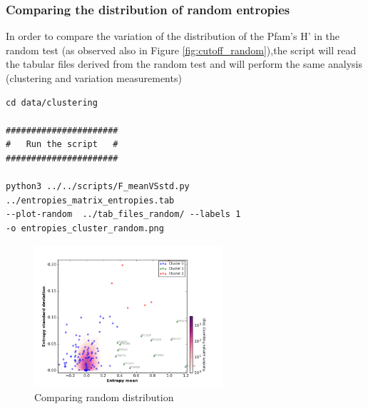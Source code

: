 \documentclass[12pt]{report}
\begin{document}
\subsubsection{Comparing  the distribution of random entropies}
In order to compare the variation of the distribution of the Pfam's H' in the random test (as observed also in Figure \ref{fig:cutoff_random}),the script will read the tabular files derived from the random test and will perform the same analysis (clustering and variation measurements) 
\begin{verbatim}
cd data/clustering

######################
#   Run the script   #
######################

python3 ../../scripts/F_meanVSstd.py  ../entropies_matrix_entropies.tab 
--plot-random  ../tab_files_random/ --labels 1 
-o entropies_cluster_random.png

\end{verbatim}
\begin{figure}[H]
  \centering
    \includegraphics[width=70mm, scale=1]{entropies_random_labels.png}
    \caption{Comparing random distribution}
        \label{fig:cluster_random}
\end{figure}
\end{document}
